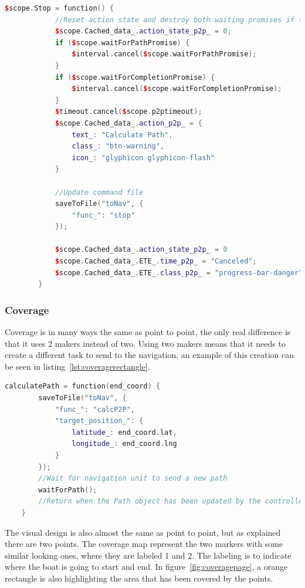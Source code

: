 \begin{lstlisting}[caption = {Stop function in p2p.js}, captionpos=b, label={lst:stop}, language=C++,firstnumber=1]
    $scope.Stop = function() {
            //Reset action state and destroy both waiting promises if they exist
            $scope.Cached_data_.action_state_p2p_ = 0;
            if ($scope.waitForPathPromise) {
                $interval.cancel($scope.waitForPathPromise);
            }
            if ($scope.waitForCompletionPromise) {
                $interval.cancel($scope.waitForCompletionPromise);
            }
            $timeout.cancel($scope.p2ptimeout);
            $scope.Cached_data_.action_p2p_ = {
                text_: "Calculate Path",
                class_: "btn-warning",
                icon_: "glyphicon glyphicon-flash"
            }
    
            //Update command file
            saveToFile("toNav", {
                "func_": "stop"
            });
    
            $scope.Cached_data_.action_state_p2p_ = 0
            $scope.Cached_data_.ETE_.time_p2p_ = "Canceled";
            $scope.Cached_data_.ETE_.class_p2p_ = "progress-bar-danger"
        }
\end{lstlisting}

\subsubsection{Coverage}
Coverage is in many ways the same as point to point, the only real difference is that it uses 2 makers instead of two. Using two makers means that it needs to create a different task to send to the navigation, an example of this creation can be seen in listing~\ref{lst:coveragerectangle}.


\begin{lstlisting}[caption = {CoverageRectangle creation in  coverage.js}, captionpos=b, label={lst:coveragerectangle}, language=C++,firstnumber=1]
calculatePath = function(end_coord) {
        saveToFile("toNav", {
            "func_": "calcP2P",
            "target_position_": {
                latitude_: end_coord.lat,
                longitude_: end_coord.lng
            }
        });
        //Wait for navigation unit to send a new path
        waitForPath();
        //Return when the Path object has been updated by the controller
    }
\end{lstlisting}

The visual design is also almost the same as point to point, but as explained there are two points. The coverage map represent the two markers with some similar looking ones, where they are labeled 1 and 2. The labeling is to indicate where the boat is going to start and end. In figure~\ref{fig:coveragepage}, a orange rectangle is also highlighting the area that has been covered by the points. 

